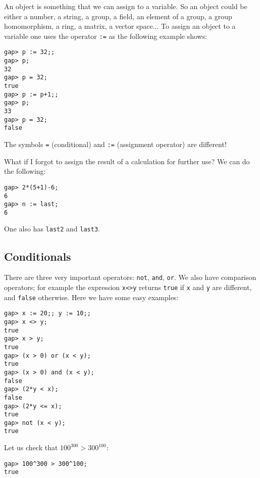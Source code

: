 An object is something that we can assign to a variable. So an object could be
either a number, a string, a group, a field, an element of a group, a group
homomorphism, a ring, a matrix, a vector space... To assign an object to a
variable one uses the operator \lstinline{:=} as the following example shows:
\begin{lstlisting}
gap> p := 32;;
gap> p;
32
gap> p = 32;
true
gap> p := p+1;;
gap> p;
33
gap> p = 32;
false
\end{lstlisting}

\begin{remark}
  The symbols \lstinline{=} (conditional) and \lstinline{:=} (assignment
  operator) are different!
\end{remark}

\begin{remark}
What if I forgot to assign the result of a calculation for further use? We
can do the following:
\begin{lstlisting}
gap> 2*(5+1)-6;                                                       
6
gap> n := last;
6
\end{lstlisting}
One also has \lstinline{last2} and \lstinline{last3}. 
\end{remark}

\subsection*{Conditionals}

There are three very important operators: \lstinline{not}, \lstinline{and},
\lstinline{or}.  We also have comparison operators; for example the expression
\lstinline{x<>y} returns \lstinline{true} if \lstinline{x} and \lstinline{y}
are different, and \lstinline{false} otherwise.  Here we have
some easy examples: 
\begin{lstlisting}
gap> x := 20;; y := 10;;
gap> x <> y;
true
gap> x > y;
true
gap> (x > 0) or (x < y);
true
gap> (x > 0) and (x < y);
false
gap> (2*y < x);
false
gap> (2*y <= x);
true
gap> not (x < y);
true	
\end{lstlisting}

\begin{example}
	Let us check that $100^{300}>300^{100}$:
\begin{lstlisting}
gap> 100^300 > 300^100;
true
\end{lstlisting}
\end{example}

